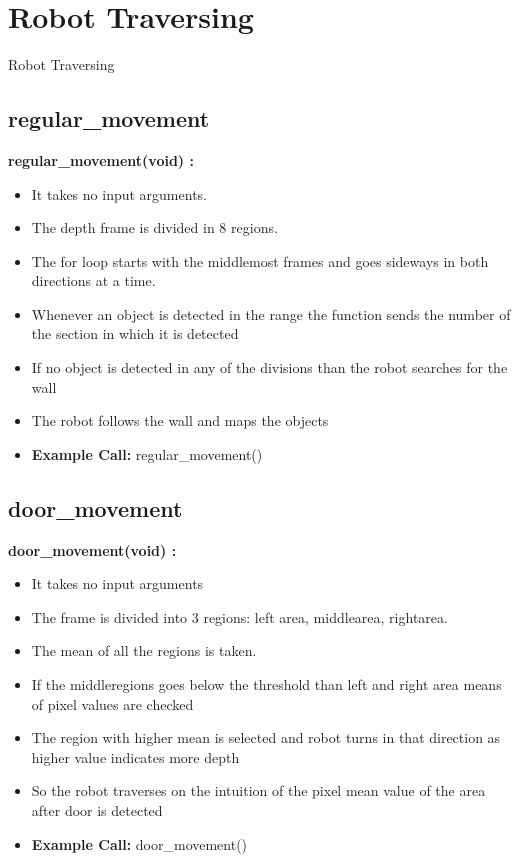 \documentclass[10pt, a4paper]{beamer}
\begin{document}
\section{Robot Traversing}
\begin{frame}[allowframebreaks]{Robot Traversing}
  \subsection{regular\_movement}
    \textbf{regular\_movement(void) : }
	\begin{itemize}
	  \item It takes no input arguments.
	  \item The depth frame is divided in 8 regions.
	  \item The for loop starts with the middlemost frames and goes sideways in both directions at a time.
	  \item Whenever an object is detected in the range the function sends the number of the section in which it is detected
	  \item If no object is detected in any of the divisions than the robot searches for the wall
	  \item The robot follows the wall and maps the objects
	  \item \textbf{Example Call:} regular\_movement()
	\end{itemize}
  \framebreak
  \subsection{door\_movement}
    \textbf{door\_movement(void) : }
      \begin{itemize}
       \item It takes no input arguments
       \item The frame is divided into 3 regions: left area, middlearea, rightarea.
       \item The mean of all the regions is taken.
       \item If the middleregions goes below the threshold than left and right area means of pixel values are checked
       \item The region with higher mean is selected and robot turns in that direction as higher value indicates more depth
       \item So the robot traverses on the intuition of the pixel mean value of the area after door is detected
       \item \textbf{Example Call:} door\_movement()
      \end{itemize}
  \framebreak

\end{frame}
\end{document}
